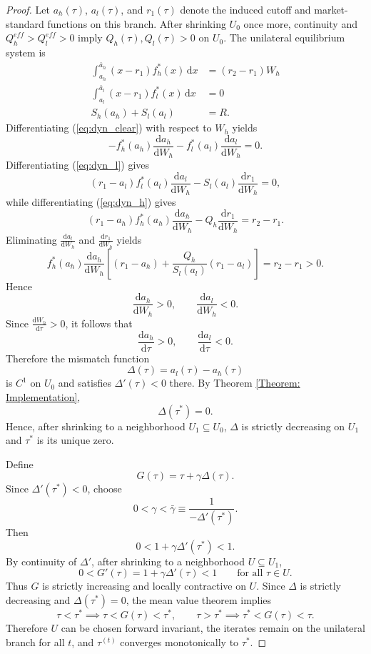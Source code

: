 \documentclass[12pt, a4paper]{article}
\begin{document}
\begin{proof}
    Let $a_h(\tau)$, $a_l(\tau)$, and $r_1(\tau)$ denote the induced cutoff and market-standard functions on this branch. After shrinking $U_0$ once more, continuity and $Q_h^{eff} > Q_l^{eff} > 0$ imply $Q_h(\tau),Q_l(\tau) > 0$ on $U_0$. The unilateral equilibrium system is
    \begin{align}
        \int_{a_h}^{\bar{a}_h} (x-r_1) f_h^*(x) \, \mathrm{d}x &= (r_2-r_1)W_h \label{eq:dyn_h}\\
        \int_{a_l}^{\bar{a}_l} (x-r_1) f_l^*(x) \, \mathrm{d}x &= 0 \label{eq:dyn_l}\\
        S_h(a_h)+S_l(a_l) &= R. \label{eq:dyn_clear}
    \end{align}
    Differentiating (\ref{eq:dyn_clear}) with respect to $W_h$ yields
    \[
        -f_h^*(a_h)\frac{\mathrm{d}a_h}{\mathrm{d}W_h}
        -f_l^*(a_l)\frac{\mathrm{d}a_l}{\mathrm{d}W_h}
        = 0.
    \]
    Differentiating (\ref{eq:dyn_l}) gives
    \[
        (r_1-a_l)f_l^*(a_l)\frac{\mathrm{d}a_l}{\mathrm{d}W_h}
        - S_l(a_l)\frac{\mathrm{d}r_1}{\mathrm{d}W_h}
        = 0,
    \]
    while differentiating (\ref{eq:dyn_h}) gives
    \[
        (r_1-a_h)f_h^*(a_h)\frac{\mathrm{d}a_h}{\mathrm{d}W_h}
        - Q_h\frac{\mathrm{d}r_1}{\mathrm{d}W_h}
        = r_2-r_1.
    \]
    Eliminating $\frac{\mathrm{d}a_l}{\mathrm{d}W_h}$ and $\frac{\mathrm{d}r_1}{\mathrm{d}W_h}$ yields
    \[
        f_h^*(a_h)\frac{\mathrm{d}a_h}{\mathrm{d}W_h}
        \left[
            (r_1-a_h)+\frac{Q_h}{S_l(a_l)}(r_1-a_l)
        \right]
        = r_2-r_1 > 0.
    \]
    Hence
    \[
        \frac{\mathrm{d}a_h}{\mathrm{d}W_h} > 0,
        \qquad
        \frac{\mathrm{d}a_l}{\mathrm{d}W_h} < 0.
    \]
    Since $\frac{\mathrm{d}W_h}{\mathrm{d}\tau} > 0$, it follows that
    \[
        \frac{\mathrm{d}a_h}{\mathrm{d}\tau} > 0,
        \qquad
        \frac{\mathrm{d}a_l}{\mathrm{d}\tau} < 0.
    \]
    Therefore the mismatch function
    \[
        \Delta(\tau) = a_l(\tau) - a_h(\tau)
    \]
    is $C^1$ on $U_0$ and satisfies $\Delta'(\tau)<0$ there. By Theorem \ref{Theorem: Implementation},
    \[
        \Delta(\tau^*) = 0.
    \]
    Hence, after shrinking to a neighborhood $U_1 \subseteq U_0$, $\Delta$ is strictly decreasing on $U_1$ and $\tau^*$ is its unique zero.

    Define
    \[
        G(\tau) = \tau + \gamma \Delta(\tau).
    \]
    Since $\Delta'(\tau^*)<0$, choose
    \[
        0<\gamma<\bar{\gamma}\equiv \frac{1}{-\Delta'(\tau^*)}.
    \]
    Then
    \[
        0<1+\gamma\Delta'(\tau^*)<1.
    \]
    By continuity of $\Delta'$, after shrinking to a neighborhood $U \subseteq U_1$,
    \[
        0<G'(\tau)=1+\gamma\Delta'(\tau)<1
        \qquad \text{for all } \tau\in U.
    \]
    Thus $G$ is strictly increasing and locally contractive on $U$. Since $\Delta$ is strictly decreasing and $\Delta(\tau^*)=0$, the mean value theorem implies
    \[
        \tau<\tau^* \implies \tau<G(\tau)<\tau^*,
        \qquad
        \tau>\tau^* \implies \tau^*<G(\tau)<\tau.
    \]
    Therefore $U$ can be chosen forward invariant, the iterates remain on the unilateral branch for all $t$, and $\tau^{(t)}$ converges monotonically to $\tau^*$.


\end{proof}
\end{document}
